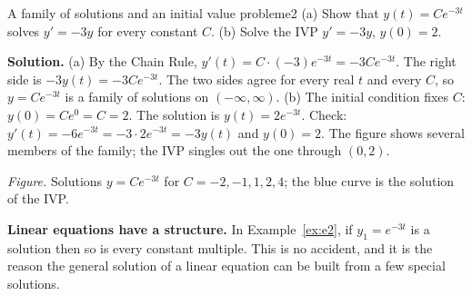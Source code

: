 \documentclass[11pt]{article}
\begin{document}
\begin{exmp}{A family of solutions and an initial value problem}{e2}
(a) Show that $y(t)=Ce^{-3t}$ solves $y'=-3y$ for every constant $C$. (b) Solve the IVP $y'=-3y$, $y(0)=2$.

\textbf{Solution.} (a) By the Chain Rule, $y'(t)=C\cdot(-3)e^{-3t}=-3Ce^{-3t}$. The right side is $-3y(t)=-3Ce^{-3t}$. The two sides agree for every real $t$ and every $C$, so $y=Ce^{-3t}$ is a family of solutions on $(-\infty,\infty)$.
(b) The initial condition fixes $C$: $y(0)=Ce^{0}=C=2$. The solution is $y(t)=2e^{-3t}$. Check: $y'(t)=-6e^{-3t}=-3\cdot2e^{-3t}=-3y(t)$ and $y(0)=2$. The figure shows several members of the family; the IVP singles out the one through $(0,2)$.
\begin{center}
\par\small\emph{Figure.} Solutions $y=Ce^{-3t}$ for $C=-2,-1,1,2,4$; the blue curve is the solution of the IVP.
\end{center}
\end{exmp}

\textbf{Linear equations have a structure.} In Example~\ref{ex:e2}, if $y_1=e^{-3t}$ is a solution then so is every constant multiple. This is no accident, and it is the reason the general solution of a linear equation can be built from a few special solutions.
\end{document}

